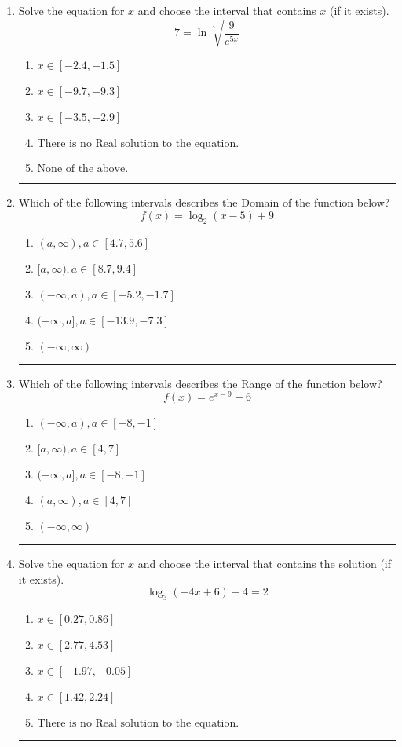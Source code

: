 \documentclass[14pt]{extbook}
\newcommand{\litem}[1]{\item#1\hspace*{-1cm}\rule{\textwidth}{0.4pt}}
\begin{document}
\begin{enumerate}
{\begin{enumerate}[label=\Alph*.]
\end{enumerate} }
\litem{
 Solve the equation for $x$ and choose the interval that contains $x$ (if it exists).\[  7 = \ln{\sqrt[7]{\frac{9}{e^{5x}}}} \]\begin{enumerate}[label=\Alph*.]
\item \( x \in [-2.4, -1.5] \)
\item \( x \in [-9.7, -9.3] \)
\item \( x \in [-3.5, -2.9] \)
\item \( \text{There is no Real solution to the equation.} \)
\item \( \text{None of the above.} \)

\end{enumerate} }
\litem{
Which of the following intervals describes the Domain of the function below?\[ f(x) = \log_2{(x-5)}+9 \]\begin{enumerate}[label=\Alph*.]
\item \( (a, \infty), a \in [4.7, 5.6] \)
\item \( [a, \infty), a \in [8.7, 9.4] \)
\item \( (-\infty, a), a \in [-5.2, -1.7] \)
\item \( (-\infty, a], a \in [-13.9, -7.3] \)
\item \( (-\infty, \infty) \)

\end{enumerate} }
\litem{
Which of the following intervals describes the Range of the function below?\[ f(x) = e^{x-9}+6 \]\begin{enumerate}[label=\Alph*.]
\item \( (-\infty, a), a \in [-8, -1] \)
\item \( [a, \infty), a \in [4, 7] \)
\item \( (-\infty, a], a \in [-8, -1] \)
\item \( (a, \infty), a \in [4, 7] \)
\item \( (-\infty, \infty) \)

\end{enumerate} }
\litem{
Solve the equation for $x$ and choose the interval that contains the solution (if it exists).\[ \log_{3}{(-4x+6)}+4 = 2 \]\begin{enumerate}[label=\Alph*.]
\item \( x \in [0.27, 0.86] \)
\item \( x \in [2.77, 4.53] \)
\item \( x \in [-1.97, -0.05] \)
\item \( x \in [1.42, 2.24] \)
\item \( \text{There is no Real solution to the equation.} \)


\end{enumerate}}
\end{enumerate}
\end{document}
